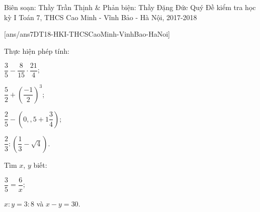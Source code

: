 
	\begin{name}
		{Biên soạn: Thầy Trần Thịnh \& Phản biện: Thầy Đặng Đức Quý}
		{Đề kiểm tra học kỳ I Toán 7, THCS Cao Minh - Vĩnh Bảo - Hà Nội, 2017-2018}
	\end{name}
\setcounter{ex}{0}
[ans/ans7DT18-HKI-THCSCaoMinh-VinhBao-HaNoi]

\begin{ex}%
	Thực hiện phép tính:
	\begin{enumEX}{2}
		\item $\dfrac{3}{5}-\dfrac{8}{15}\cdot \dfrac{21}{4}$;
		\item $\dfrac{5}{2}+\left(\dfrac{-1}{2}\right)^3$;
		\item $\dfrac{2}{5}-\left(0,{,}5+1\dfrac{3}{4}\right)$;
		\item $\dfrac{2}{3} : \left(\dfrac{1}{3}-\sqrt{4}\right)$.
	\end{enumEX}	
\end{ex}

\begin{ex}%
	Tìm $x$, $y$ biết:
	\begin{enumEX}{2}
		\item $\dfrac{3}{5}=\dfrac{6}{x}$;
		\item $x : y=3 : 8$ và $x-y=30$.
	\end{enumEX}
\end{ex}

